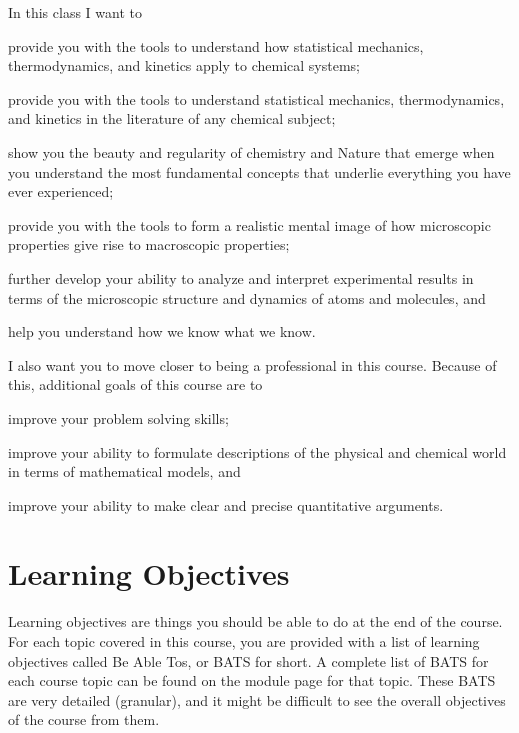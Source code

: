\documentclass[letterpaper,oneside,onecolumn,11pt,article]{memoir}
\begin{document}
In this class I want to
\begin{inparaenum}
\item provide you with the tools to understand how statistical mechanics, thermodynamics, and kinetics apply to chemical systems;
\item provide you with the tools to understand statistical mechanics, thermodynamics, and kinetics in the literature of any chemical subject;
\item show you the beauty and regularity of chemistry and Nature that emerge when you understand the most fundamental concepts that underlie everything you have ever experienced;
\item provide you with the tools to form a realistic mental image of how microscopic properties give rise to macroscopic properties;
\item further develop your ability to analyze and interpret experimental results in terms of the microscopic structure and dynamics of atoms and molecules, and 
\item help you understand how we know what we know.
\end{inparaenum}

I also want you to move closer to being a professional in this course. Because of this, additional goals of this course are to
\begin{inparaenum}
\item improve your problem solving skills;
\item improve your ability to formulate descriptions of the physical and chemical world in terms of mathematical models, and
\item improve your ability to make clear and precise quantitative arguments.
\end{inparaenum}

\section{Learning Objectives}

Learning objectives are things you should be able to do at the end of the course. For each topic covered in this course, you are provided with a list of learning objectives called Be Able Tos, or BATS for short. A complete list of BATS for each course topic can be found on the module page for that topic. These BATS are very detailed (granular), and it might be difficult to see the overall objectives of the course from them.
\end{document}
